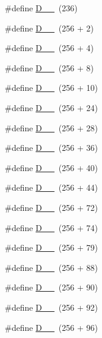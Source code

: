 \begin{DoxyCompactItemize}
\item 
\#define \hyperlink{group___d_r_i_v_e_r_s_ga9141d44a2f2636d23c001b5832118326}{D\+\_\+\_}~(236)
\item 
\#define \hyperlink{group___d_r_i_v_e_r_s_gab444dc9d9eaf98f46563cc87fcb965a4}{D\+\_\+\_}~(256 + 2)
\item 
\#define \hyperlink{group___d_r_i_v_e_r_s_ga83973bf9de6879524cca19f3332e707e}{D\+\_\+\_}~(256 + 4)
\item 
\#define \hyperlink{group___d_r_i_v_e_r_s_ga2f44fbe8696fcc34619d6e61916c22d0}{D\+\_\+\_}~(256 + 8)
\item 
\#define \hyperlink{group___d_r_i_v_e_r_s_ga6b208218857c2067078082e832148f61}{D\+\_\+\_}~(256 + 10)
\item 
\#define \hyperlink{group___d_r_i_v_e_r_s_gac84316958d525db0c89e1519e8af6637}{D\+\_\+\_}~(256 + 24)
\item 
\#define \hyperlink{group___d_r_i_v_e_r_s_ga2533cfdd19cb87a86667620a33a9d561}{D\+\_\+\_}~(256 + 28)
\item 
\#define \hyperlink{group___d_r_i_v_e_r_s_ga359aac18087bef8a3f044faf13952fa2}{D\+\_\+\_}~(256 + 36)
\item 
\#define \hyperlink{group___d_r_i_v_e_r_s_gae0dfa8b55558dff48604d4ac2c28fa9c}{D\+\_\+\_}~(256 + 40)
\item 
\#define \hyperlink{group___d_r_i_v_e_r_s_ga4fd075d6c0e817fbafca24af8305386e}{D\+\_\+\_}~(256 + 44)
\item 
\#define \hyperlink{group___d_r_i_v_e_r_s_ga065f93eacb4dcc7020cc21146e533110}{D\+\_\+\_}~(256 + 72)
\item 
\#define \hyperlink{group___d_r_i_v_e_r_s_gaadac9643410cb6abb08481bebc549d0d}{D\+\_\+\_}~(256 + 74)
\item 
\#define \hyperlink{group___d_r_i_v_e_r_s_gae6ba99808ab9bc8eaddbc7c7cc6af1f3}{D\+\_\+\_}~(256 + 79)
\item 
\#define \hyperlink{group___d_r_i_v_e_r_s_ga05bc14cf9653fc7778acfa75c9ac19df}{D\+\_\+\_}~(256 + 88)
\item 
\#define \hyperlink{group___d_r_i_v_e_r_s_ga63bb29a8be69128a60f4716aacc447a8}{D\+\_\+\_}~(256 + 90)
\item 
\#define \hyperlink{group___d_r_i_v_e_r_s_gabd8a1ea9b71ac9389116a33e317aad6c}{D\+\_\+\_}~(256 + 92)
\item 
\#define \hyperlink{group___d_r_i_v_e_r_s_ga9deaa01235044f6470a4269db6b624ea}{D\+\_\+\_}~(256 + 96)

\end{DoxyCompactItemize}
